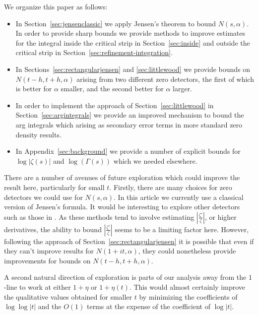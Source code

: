\documentclass[10pt,english,letter, reqno]{amsart}
\theoremstyle{plain}
\theoremstyle{definition}
\begin{document}
We organize this paper as follows:
\begin{itemize}

    \item In Section~\ref{sec:jensenclassic} we apply Jensen's theorem to bound $N(s,\alpha)$. 
    In order to provide sharp bounds we provide methods to improve estimates for the integral inside the critical strip in Section~\ref{sec:inside}  and outside the critical strip in Section~\ref{sec:refinement-integration}. 

    \item In Sections~\ref{sec:rectangularjensen} and \ref{sec:littlewood} we provide bounds on $N(t-h,t+h,\alpha)$ arising from two different zero detectors, the first of which is better for $\alpha$ smaller, and the second better for $\alpha$ larger. 
    
    \item In order to implement the approach of Section~\ref{sec:littlewood}  in Section~\ref{sec:argintegrals} we provide an improved mechanism to bound the arg integrals which arising as secondary error terms in more standard zero density results.

       \item In Appendix~\ref{sec:background} we provide a number of explicit bounds for $\log|\zeta(s)|$ and $\log(\Gamma(s))$ which we needed elsewhere.
\end{itemize}

There are a number of avenues of future exploration which could improve the result here, particularly for small $t$.
Firstly, there are many choices for zero detectors we could use for $N(s,\alpha)$. In this article we currently use a classical version of Jensen's formula. It would be interesting to explore other detectors such as those in \cite{Ford2002,Ford2019,Bellotti2025,ThornerZaman2024,HeathBrown1992}. As these methods tend to involve estimating $|\frac{\zeta'}{\zeta}|$, or higher derivatives, the ability to bound $|\frac{\zeta'}{\zeta}|$ seems to be a limiting factor here.
However, following the approach of Section~\ref{sec:rectangularjensen} it is possible that even if they can't improve results for $N(1+it,\alpha)$, they could  nonetheless provide improvements for bounds on $N(t-h,t+h,\alpha)$.

A second natural direction of exploration is parts of our analysis away from the $1$-line to work at either $1+\eta$ or $1+\eta(t)$. This would almost certainly improve the qualitative values obtained for smaller $t$ by minimizing the coefficients of $\log\log|t|$ and the $O(1)$ terms at the expense of the coefficient of $\log|t|$.
\end{document}
